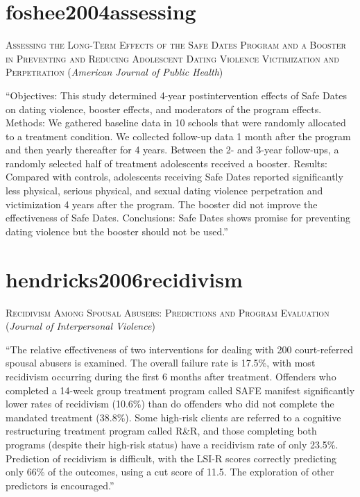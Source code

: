 \documentclass[]{tufte-handout}
\begin{document}
\section{\texorpdfstring{\textcolor[HTML]{5b0057}{foshee2004assessing}}{}}\label{section-5}

\textsc{\large{Assessing the Long-Term Effects of the Safe Dates Program and a Booster in Preventing and Reducing Adolescent Dating Violence Victimization and Perpetration}}
(\emph{American Journal of Public Health})

``Objectives: This study determined 4-year postintervention effects of
Safe Dates on dating violence, booster effects, and moderators of the
program effects. Methods: We gathered baseline data in 10 schools that
were randomly allocated to a treatment condition. We collected follow-up
data 1 month after the program and then yearly thereafter for 4 years.
Between the 2- and 3-year follow-ups, a randomly selected half of
treatment adolescents received a booster. Results: Compared with
controls, adolescents receiving Safe Dates reported significantly less
physical, serious physical, and sexual dating violence perpetration and
victimization 4 years after the program. The booster did not improve the
effectiveness of Safe Dates. Conclusions: Safe Dates shows promise for
preventing dating violence but the booster should not be used.''

\section{\texorpdfstring{\textcolor[HTML]{5b0057}{hendricks2006recidivism}}{}}\label{section-6}

\textsc{\large{Recidivism Among Spousal Abusers: Predictions and Program Evaluation}}
(\emph{Journal of Interpersonal Violence})

``The relative effectiveness of two interventions for dealing with 200
court-referred spousal abusers is examined. The overall failure rate is
17.5\%, with most recidivism occurring during the first 6 months after
treatment. Offenders who completed a 14-week group treatment program
called SAFE manifest significantly lower rates of recidivism (10.6\%)
than do offenders who did not complete the mandated treatment (38.8\%).
Some high-risk clients are referred to a cognitive restructuring
treatment program called R\&R, and those completing both programs
(despite their high-risk status) have a recidivism rate of only 23.5\%.
Prediction of recidivism is difficult, with the LSI-R scores correctly
predicting only 66\% of the outcomes, using a cut score of 11.5. The
exploration of other predictors is encouraged.''
\end{document}
